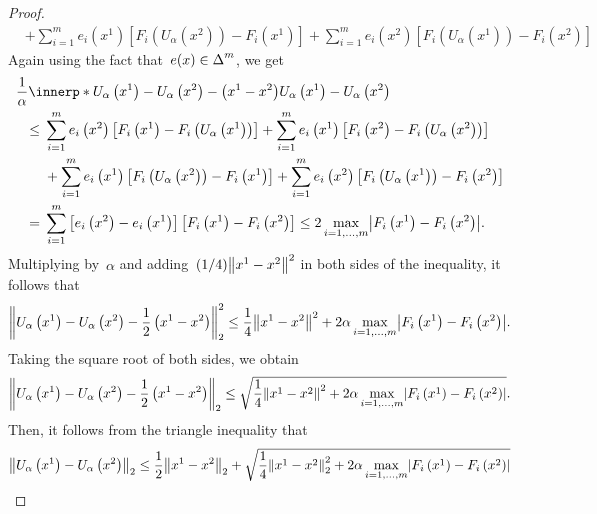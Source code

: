 \documentclass[../../main]{subfiles}
\begin{document}
\begin{proof}
\begin{align}
            & + \sum_{i = 1}^{m} e_i\left(x^1\right) \left[ F_i\left(U_\alpha\left(x^2\right)\right) - F_i\left(x^1\right) \right] + \sum_{i = 1}^{m} e_i\left(x^2\right) \left[ F_i\left(U_\alpha\left(x^1\right)\right) - F_i\left(x^2\right) \right]
    \end{align}
    Again using the fact that~$e(x) \in \operatorname{\Delta}^m$, we get
    \begin{align}
        \MoveEqLeft \frac{1}{\alpha} \innerp*{U_\alpha\left(x^1\right) - U_\alpha\left(x^2\right) - \left(x^1 - x^2\right)}{U_\alpha\left(x^1\right) - U_\alpha\left(x^2\right)}                                                                          \\
        \le{} & \sum_{i = 1}^{m} e_i\left(x^2\right) \left[ F_i\left(x^1\right) - F_i\left(U_\alpha\left(x^1\right)\right) \right] + \sum_{i = 1}^{m} e_i\left(x^1\right) \left[ F_i\left(x^2\right) - F_i\left(U_\alpha\left(x^2\right)\right) \right]   \\
              & + \sum_{i = 1}^{m} e_i\left(x^1\right) \left[ F_i\left(U_\alpha\left(x^2\right)\right) - F_i\left(x^1\right) \right] + \sum_{i = 1}^{m} e_i\left(x^2\right) \left[ F_i\left(U_\alpha\left(x^1\right)\right) - F_i\left(x^2\right) \right] \\
        ={}   & \sum_{i = 1}^{m} \left[ e_i\left(x^2\right) - e_i\left(x^1\right) \right] \left[ F_i\left(x^1\right) - F_i\left(x^2\right) \right]
        \le 2 \max_{i = 1, \dots, m} \abs*{F_i\left(x^1\right) - F_i\left(x^2\right)}
        .\end{align}
    Multiplying by~$\alpha$ and adding~$(1 / 4) \norm*{x^1 - x^2}^2$ in both sides of the inequality, it follows that
    \begin{equation}
        \norm*{U_\alpha\left(x^1\right) - U_\alpha\left(x^2\right) - \frac{1}{2} \left( x^1 - x^2 \right) }_2^2 \le \frac{1}{4} \norm*{x^1 - x^2}^2 + 2 \alpha \max_{i = 1, \dots, m} \abs*{F_i\left(x^1\right) - F_i\left(x^2\right)}
        .\end{equation}
    Taking the square root of both sides, we obtain
    \begin{equation}
        \norm*{U_\alpha\left(x^1\right) - U_\alpha\left(x^2\right) - \frac{1}{2} \left( x^1 - x^2 \right) }_2 \le \sqrt{\frac{1}{4} \norm*{x^1 - x^2}^2 + 2 \alpha \max_{i = 1, \dots, m} \abs*{F_i\left(x^1\right) - F_i\left(x^2\right)}}
        .\end{equation}
    Then, it follows from the triangle inequality that
    \begin{equation}
        \norm*{U_\alpha\left(x^1\right) - U_\alpha\left(x^2\right)}_2 \le \frac{1}{2} \norm*{x^1 - x^2}_2 + \sqrt{\frac{1}{4} \norm*{x^1 - x^2}_2^2 + 2 \alpha \max_{i = 1, \dots, m} \abs*{F_i\left(x^1\right) - F_i\left(x^2\right)}}

\end{equation}
\end{proof}
\end{document}
